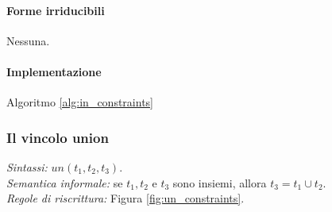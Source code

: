 \documentclass[12pt,a4paper,openright]{book} %
\begin{document}
\paragraph{Forme irriducibili} Nessuna.

\paragraph{Implementazione}
Algoritmo \ref{alg:in_constraints}

\subsubsection{Il vincolo union}

\textit{Sintassi:} $un(t_1, t_2, t_3)$.\\
\noindent\textit{Semantica informale:} se $t_1, t_2$ e $t_3$ sono insiemi,  allora $t_3 = t_1 \cup t_2$.\\
\noindent\textit{Regole di riscrittura:} Figura \ref{fig:un_constraints}.
\end{document}
